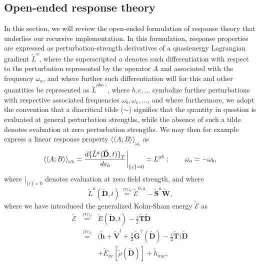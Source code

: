 \documentclass[%
 reprint,
 amsmath,amssymb,
 aps,
]{revtex4-1}
\begin{document}
\subsection{Open-ended response theory}
\label{rsp_theory}

In this section, we will review the open-ended formulation of response theory that underlies our recursive implementation. In this formulation, response properties are expressed as perturbation-strength derivatives of a quasienergy Lagrangian gradient $\tilde{L}^a$, where the superscripted $a$ denotes such differentiation with respect to the perturbation represented by the operator $A$ and associated with the frequency $\omega_{a}$, and where further such differentiation will for this and other quantities be represented as $\tilde{L}^{abc\cdots}$, where $b, c, \ldots$ symbolize further perturbations with respective associated frequencies $\omega_{b}, \omega_{c}, \ldots$, and where furthermore, we adopt the convention that a diacritical tilde ($\sim$) signifies that the quantity in question is evaluated at general perturbation strengths, while the absence of such a tilde denotes evaluation at zero perturbation strengths. We may then for example express a linear response property $\langle \langle A ; B \rangle \rangle_{\omega_{b}}$ as 
\begin{equation}
\label{LRF-D}
\langle \langle A ; B \rangle \rangle_{\omega_{b}} =
\frac{d { \{ \tilde{L}^a (\tilde{\mathbf{D}}, t) \} }_T }
{d\varepsilon_b} \biggr{\vert}_{
\{ \varepsilon \} = 0 } = L^{ab} \text{ ; } \qquad
\omega_a = -\omega_{b}\text{,}
\end{equation}
where $\vert_{ \{ \varepsilon \} = 0 }$ denotes evaluation at zero field strength, and where
\begin{equation}\label{La}
\tilde{L}^a (\tilde{\mathbf{D}}, t) \stackrel{\,^{\{\mathrm{Tr}\}_T}}{=} 
\tilde{\mathcal{E}}^{0, a} -  \tilde{\mathbf{S}}^a \tilde{\mathbf{W}}\text{,}
\end{equation}
where we have introduced the generalized Kohn-Sham energy $\tilde{\mathcal{E}}$ as
\begin{eqnarray}\nonumber
\tilde{\mathcal{E}} &\stackrel{\,^{\{\mathrm{Tr}\}_T}}{=}&
\tilde{E}(\tilde{\mathbf{D}}, t) - 
{\textstyle \frac{i}{2}} \tilde{\mathbf{T}} \tilde{\mathbf{D}} \\ \label{G-EKS} &\stackrel{\,^{\{\mathrm{Tr}\}_T}}{=}&
 \bigl( \tilde{\mathbf{h}} + \tilde{\mathbf{V}}^t +
{\textstyle \frac{1}{2}}
\tilde{\mathbf{G}}^{\gamma}(\tilde{\mathbf{D}}) 
 - {\textstyle \frac{i}{2}} \tilde{\mathbf{T}} \bigr) \tilde{\mathbf{D}} \\ 
\nonumber && + \tilde{E}_{xc}[\tilde{\rho}(\tilde{\mathbf{D}})]
+ \tilde{h}_{nuc}\text{,}
\end{eqnarray}
\end{document}
